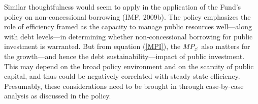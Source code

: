 \documentclass[11pt]{article}
\begin{document}
\begin{appendix}
Similar thoughtfulness would seem to apply in the application of the Fund's
policy on non-concessional borrowing (IMF, 2009b). The policy emphasizes the
role of efficiency framed as the capacity to manage public resources
well---along with debt levels---in determining whether non-concessional
borrowing for public investment is warranted. But from equation (\ref{MPI}),
the $MP_{z^{e}}$ also matters for the growth---and hence the debt
sustainability---impact of public investment. This may depend on the broad
policy environment and on the scarcity of public capital, and thus could be
negatively correlated with steady-state efficiency. Presumably, these
considerations need to be brought in through case-by-case analysis as
discussed in the policy.

\end{appendix}%
\pagebreak
\end{document}
